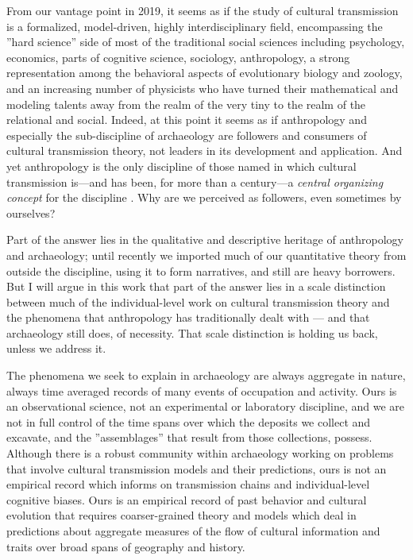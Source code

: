 
From our vantage point in 2019, it seems as if the study of cultural transmission is a  formalized, model-driven, highly interdisciplinary field, encompassing the ''hard science'' side of most of the traditional social sciences including psychology, economics, parts of cognitive science, sociology, anthropology, a strong representation among the behavioral aspects of evolutionary biology and zoology, and an increasing number of physicists who have turned their mathematical and modeling talents away from the realm of the very tiny to the realm of the relational and social.  Indeed, at this point it seems as if anthropology and especially the sub-discipline of archaeology are followers and consumers of cultural transmission theory, not leaders in its development and application.  And yet anthropology is the only discipline of those named in which cultural transmission is---and has been, for more than a century---a \emph{central organizing concept} for the discipline \citep{lyman2008cultural}.  Why are we perceived as followers, even sometimes by ourselves?  

Part of the answer lies in the qualitative and descriptive heritage of anthropology and archaeology; until recently we imported much of our quantitative theory from outside the discipline, using it to form narratives, and still are heavy borrowers.  But I will argue in this work that part of the answer lies in a scale distinction between much of the individual-level work on cultural transmission theory and the phenomena that anthropology has traditionally dealt with — and that archaeology still does, of necessity.  That scale distinction is holding us back, unless we address it.

The phenomena we seek to explain in archaeology are always aggregate in nature, always time averaged records of many events of occupation and activity.  Ours is an observational science, not an experimental or laboratory discipline, and we are not in full control of the time spans over which the deposits we collect and excavate, and the ''assemblages'' that result from those collections, possess.  Although there is a robust community within archaeology working on problems that involve cultural transmission models and their predictions, ours is not an empirical record which informs on transmission chains and individual-level cognitive biases.  Ours is an empirical record of past behavior and cultural evolution that requires coarser-grained theory and models which deal in predictions about aggregate measures of the flow of cultural information and traits over broad spans of geography and history.

